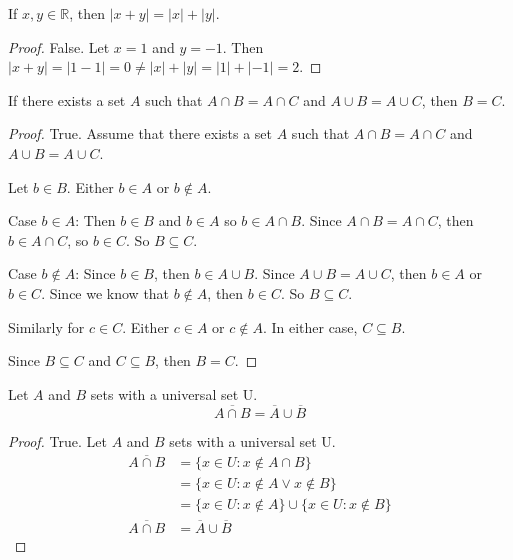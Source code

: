 \documentclass[12 pt]{exam}
\begin{document}
\begin{questions}
\question If $x,y \in \mathbb{R}$, then $|x + y| = |x| + |y|$. 

\begin{solution}\begin{proof}
False. Let $x = 1$ and $y = -1$. Then $|x+y| = |1-1| = 0 \neq |x| + |y| = |1| + |-1| = 2$.
\end{proof}\end{solution}


\question If there exists a set $A$ such that $A \cap B = A \cap C$ and $A \cup B = A \cup C$, then $B=C.$

\begin{solution}\begin{proof}
    True. Assume that there exists a set $A$ such that $A \cap B = A \cap C$ and $A \cup B = A \cup C$.

    Let $b \in B$. Either $b \in A$ or $b \notin A$.

    Case $b \in A$: Then $b \in B$ and $b \in A$ so $b \in A \cap B$. Since $A \cap B = A \cap C$,
    then $b \in A \cap C$, so $b \in C$. So $B \subseteq C$.

    Case $b \notin A$: Since $b \in B$, then $b \in A \cup B$. Since $A \cup B = A \cup C$,
    then $b \in A$ or $b \in C$. Since we know that $b \notin A$, then $b \in C$. So $B \subseteq C$.

    Similarly for $c \in C$. Either $c \in A$ or $c \notin A$. In either case, $C \subseteq B$.

    Since $B \subseteq C$ and $C \subseteq B$, then $B = C$.
\end{proof}\end{solution}


\question Let $A$ and $B$ sets with a universal set U. 
$$\overline{A \cap B} = \overline{A} \cup \overline{B}$$

\begin{solution}\begin{proof}
    True. Let $A$ and $B$ sets with a universal set U.
    \begin{align*}
        \overline{A \cap B} &= \{x \in U: x \notin A \cap B\}\\
        &= \{x \in U: x \notin A \lor x \notin B\}\\
        &= \{x \in U: x \notin A\} \cup \{x \in U: x \notin B\}\\
        \overline{A \cap B} &= \overline{A} \cup \overline{B}
    \end{align*}
\end{proof}\end{solution}




\end{questions}
\end{document}
